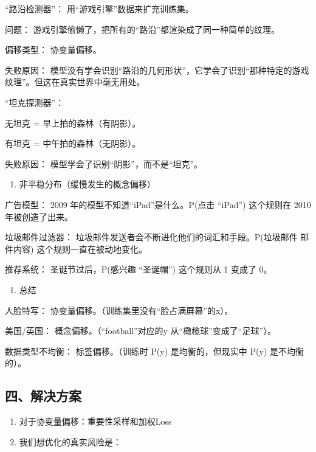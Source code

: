 ``路沿检测器''： 用``游戏引擎''数据来扩充训练集。

问题： 游戏引擎偷懒了，把所有的``路沿''都渲染成了同一种简单的纹理。

偏移类型： 协变量偏移。

失败原因： 模型没有学会识别``路沿的几何形状''，它学会了识别``那种特定的游戏纹理''。但这在真实世界中毫无用处。

``坦克探测器''：

无坦克 = 早上拍的森林（有阴影）。

有坦克 = 中午拍的森林（无阴影）。

失败原因： 模型学会了识别``阴影''，而不是``坦克''。

\begin{enumerate}
\def\labelenumi{\arabic{enumi}.}
\setcounter{enumi}{2}
\tightlist
\item
  非平稳分布（缓慢发生的概念偏移）
\end{enumerate}

广告模型： 2009 年的模型不知道``iPad''是什么。P(点击 \textbar{} ``iPad'') 这个规则在 2010 年被创造了出来。

垃圾邮件过滤器： 垃圾邮件发送者会不断进化他们的词汇和手段。P(垃圾邮件 \textbar{} 邮件内容) 这个规则一直在被动地变化。

推荐系统： 圣诞节过后，P(感兴趣 \textbar{} ``圣诞帽'') 这个规则从 1 变成了 0。

\begin{enumerate}
\def\labelenumi{\arabic{enumi}.}
\setcounter{enumi}{3}
\tightlist
\item
  总结
\end{enumerate}

人脸特写： 协变量偏移。（训练集里没有``脸占满屏幕''的x）。

美国/英国： 概念偏移。（``football''对应的y 从``橄榄球''变成了``足球''）。

数据类型不均衡： 标签偏移。（训练时 P(y) 是均衡的，但现实中 P(y) 是不均衡的）。

\hypertarget{ux56dbux89e3ux51b3ux65b9ux6848}{%
\subsection{四、解决方案}\label{ux56dbux89e3ux51b3ux65b9ux6848}}

\begin{enumerate}
\def\labelenumi{\arabic{enumi}.}
\item
  对于协变量偏移：重要性采样和加权Loss
\item
  我们想优化的真实风险是：
\end{enumerate}


